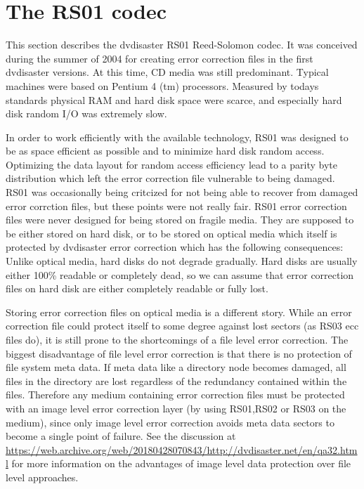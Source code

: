 \newpage
\section{The RS01 codec}
\label{rs01}
This section describes the dvdisaster RS01 Reed-Solomon codec. 
It was conceived during the summer of 2004 for creating 
error correction files in the first dvdisaster versions.
At this time, CD media was still predominant. 
Typical machines were based on Pentium 4 (tm) processors.
Measured by todays standards physical RAM and hard disk
space were scarce, and especially hard disk random I/O
was extremely slow. 

\smallskip

In order to work efficiently with the available technology,
RS01 was designed to be as space efficient as possible 
and to minimize hard disk random access. 
Optimizing the data layout for random access efficiency
lead to a parity byte distribution which left the error correction
file vulnerable to being damaged. RS01 was 
occasionally being critcized for not being able to recover 
from damaged error corrction files, but these points
were not really fair. RS01 error correction
files were never designed for being stored on fragile
media. They are supposed to
be either stored on hard disk, or to be stored on optical
media which itself is protected by dvdisaster error
correction which has the following consequences:
 Unlike optical media, hard disks do not degrade
gradually. Hard disks are usually either 100\% readable or 
completely dead, so we can assume that error correction
files on hard disk are either completely readable or fully lost.

Storing error correction files on optical media is a different
story. While an error correction file could protect itself to some
degree against lost sectors (as RS03 ecc files do), it is still
prone to the shortcomings of a file level error correction. 
The biggest disadvantage of file level error correction is
that there is no protection of file system meta data.
If meta data like a directory node becomes damaged, all files
in the directory are lost regardless of the redundancy contained
within the files. Therefore any medium containing error 
correction files must be protected with an image level
error correction layer (by using RS01,RS02 or RS03 on the medium), 
since only image level error correction avoids meta 
data sectors to become a single point of failure. See the
discussion at \url{https://web.archive.org/web/20180428070843/http://dvdisaster.net/en/qa32.html} for
more information on the advantages of image level data protection
over file level approaches.

